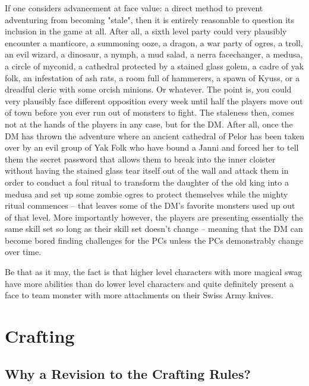 If one considers advancement at face value: a direct method to prevent adventuring from becoming "stale", then it is entirely reasonable to question its inclusion in the game at all. After all, a sixth level party could very plausibly encounter a manticore, a summoning ooze, a dragon, a war party of ogres, a troll, an evil wizard, a dinosaur, a nymph, a mud salad, a nerra facechanger, a medusa, a circle of myconid, a cathedral protected by a stained glass golem, a cadre of yak folk, an infestation of ash rats, a room full of hammerers, a spawn of Kyuss, or a dreadful cleric with some orcish minions. Or whatever. The point is, you could very plausibly face different opposition every week until half the players move out of town before you ever run out of monsters to fight. The staleness then, comes not at the hands of the players in any case, but for the DM. After all, once the DM has thrown the adventure where an ancient cathedral of Pelor has been taken over by an evil group of Yak Folk who have bound a Janni and forced her to tell them the secret password that allows them to break into the inner cloister without having the stained glass tear itself out of the wall and attack them in order to conduct a foul ritual to transform the daughter of the old king into a medusa and set up some zombie ogres to protect themselves while the mighty ritual commences -- that leaves some of the DM's favorite monsters used up out of that level. More importantly however, the players are presenting essentially the same skill set so long as their skill set doesn't change -- meaning that the DM can become bored finding challenges for the PCs unless the PCs demonstrably change over time.

Be that as it may, the fact is that higher level characters with more magical swag have more abilities than do lower level characters and quite definitely present a face to team monster with more attachments on their Swiss Army knives.


\section{Crafting}

\subsection{Why a Revision to the Crafting Rules?}

